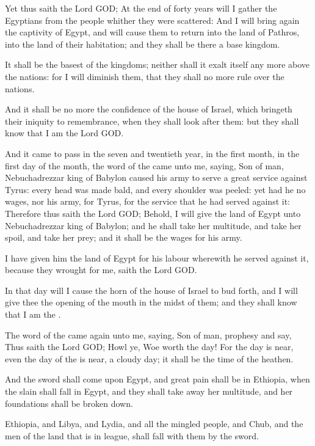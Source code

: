 \Verse Yet thus saith the Lord GOD; At the end of forty years will I gather the Egyptians from the people whither they were scattered: \Verse And I will bring again the captivity of Egypt, and will cause them to return into the land of Pathros, into the land of their habitation; and they shall be there a base kingdom.

\Verse It shall be the basest of the kingdoms; neither shall it exalt itself any more above the nations: for I will diminish them, that they shall no more rule over the nations.

\Verse And it shall be no more the confidence of the house of Israel, which bringeth their iniquity to remembrance, when they shall look after them: but they shall know that I am the Lord GOD.

\Verse And it came to pass in the seven and twentieth year, in the first month, in the first day of the month, the word of the \LORD came unto me, saying, \Verse Son of man, Nebuchadrezzar king of Babylon caused his army to serve a great service against Tyrus: every head was made bald, and every shoulder was peeled: yet had he no wages, nor his army, for Tyrus, for the service that he had served against it: \Verse Therefore thus saith the Lord GOD; Behold, I will give the land of Egypt unto Nebuchadrezzar king of Babylon; and he shall take her multitude, and take her spoil, and take her prey; and it shall be the wages for his army.

\Verse I have given him the land of Egypt for his labour wherewith he served against it, because they wrought for me, saith the Lord GOD.

\Verse In that day will I cause the horn of the house of Israel to bud forth, and I will give thee the opening of the mouth in the midst of them; and they shall know that I am the \LORD.


\Chapter
\Verse The word of the \LORD came again unto me, saying, \Verse Son of man, prophesy and say, Thus saith the Lord GOD; Howl ye, Woe worth the day!  \Verse For the day is near, even the day of the \LORD is near, a cloudy day; it shall be the time of the heathen.

\Verse And the sword shall come upon Egypt, and great pain shall be in Ethiopia, when the slain shall fall in Egypt, and they shall take away her multitude, and her foundations shall be broken down.

\Verse Ethiopia, and Libya, and Lydia, and all the mingled people, and Chub, and the men of the land that is in league, shall fall with them by the sword.


